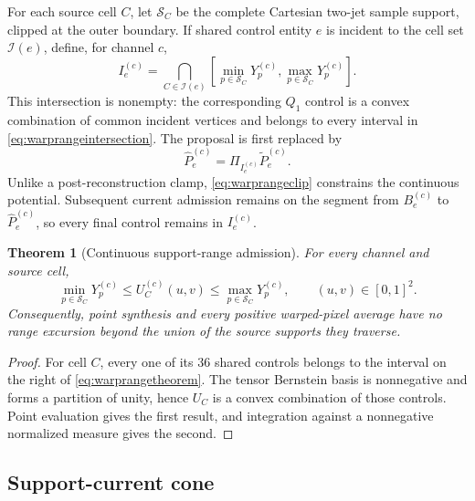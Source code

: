 \documentclass[journal]{IEEEtran}
\newtheorem{theorem}{Theorem}
\begin{document}
For each source cell \(C\), let \(\mathcal S_C\) be the complete Cartesian
two-jet sample support, clipped at the outer boundary.  If shared control
entity \(e\) is incident to the cell set \(\mathcal I(e)\), define, for
channel \(c\),
\begin{equation}
 I_e^{(c)}=
 \bigcap_{C\in\mathcal I(e)}
 \left[
  \min_{p\in\mathcal S_C}Y_p^{(c)},
  \max_{p\in\mathcal S_C}Y_p^{(c)}
 \right].
 \label{eq:warprangeintersection}
\end{equation}
This intersection is nonempty: the corresponding \(Q_1\) control is a
convex combination of common incident vertices and belongs to every interval
in \eqref{eq:warprangeintersection}.  The proposal is first replaced by
\begin{equation}
 \widehat P_e^{(c)}=\Pi_{I_e^{(c)}}\widetilde P_e^{(c)}.
 \label{eq:warprangeclip}
\end{equation}
Unlike a post-reconstruction clamp, \eqref{eq:warprangeclip} constrains the
continuous potential.  Subsequent current admission remains on the segment
from \(B_e^{(c)}\) to \(\widehat P_e^{(c)}\), so every final control remains
in \(I_e^{(c)}\).

\begin{theorem}[Continuous support-range admission]
For every channel and source cell,
\begin{equation}
 \min_{p\in\mathcal S_C}Y_p^{(c)}
 \leq U_C^{(c)}(u,v)\leq
 \max_{p\in\mathcal S_C}Y_p^{(c)},
 \qquad (u,v)\in[0,1]^2.
 \label{eq:warprangetheorem}
\end{equation}
Consequently, point synthesis and every positive warped-pixel average have no
range excursion beyond the union of the source supports they traverse.
\end{theorem}

\begin{proof}
For cell \(C\), every one of its 36 shared controls belongs to the interval
on the right of \eqref{eq:warprangetheorem}.  The tensor Bernstein basis is
nonnegative and forms a partition of unity, hence \(U_C\) is a convex
combination of those controls.  Point evaluation gives the first result, and
integration against a nonnegative normalized measure gives the second.
\end{proof}

\subsection{Support-current cone}
\end{document}
